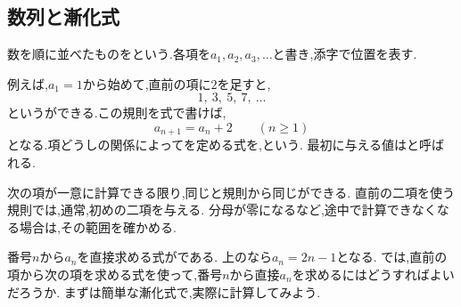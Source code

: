 \subsection{数列と漸化式}\label{節：数列と漸化式}
数を順に並べたものをという.各項を$a_1,a_2,a_3,\ldots$と書き,添字で位置を表す.

例えば,$a_1=1$から始めて,直前の項に$2$を足すと,
\[
  1,\ 3,\ 5,\ 7,\ \ldots
\]
というができる.この規則を式で書けば,
\[
  a_{n+1}=a_n+2\qquad(n\ge1)
\]
となる.項どうしの関係によってを定める式を,という.
最初に与える値はと呼ばれる.

次の項が一意に計算できる限り,同じと規則から同じができる.
直前の二項を使う規則では,通常,初めの二項を与える.
分母が零になるなど,途中で計算できなくなる場合は,その範囲を確かめる.

番号$n$から$a_n$を直接求める式がである.
上のなら$a_n=2n-1$となる.
では,直前の項から次の項を求める式を使って,番号$n$から直接$a_n$を求めるにはどうすればよいだろうか.
まずは簡単な漸化式で,実際に計算してみよう.
